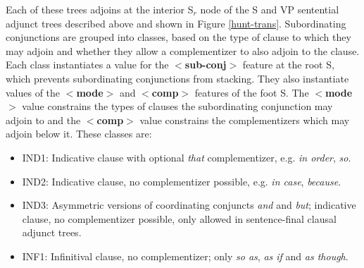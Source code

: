 Each of these trees adjoins at the interior S$_r$ node of the S and VP
sentential adjunct trees described above and shown in Figure \ref{hunt-trans}.
Subordinating conjunctions are grouped into classes, based on the type of
clause to which they may adjoin and whether they allow a complementizer to also
adjoin to the clause.  Each class instantiates a value for the {\bf
$<$sub-conj$>$} feature at the root S, which prevents subordinating
conjunctions from stacking.  They also instantiate values of the {\bf
$<$mode$>$} and {\bf $<$comp$>$} features of the foot S.  The {\bf $<$mode$>$}
value constrains the types of clauses the subordinating conjunction may adjoin
to and the {\bf $<$comp$>$} value constrains the complementizers which may
adjoin below it.  These classes are:

\begin{itemize}
\item IND1: Indicative clause with optional {\it that} complementizer,
e.g. {\it in order}, {\it so}.
\begin{itemize}
\end{itemize}

\item IND2: Indicative clause, no complementizer possible, e.g. {\it
in case}, {\it because}.
\begin{itemize}
\end{itemize}

\item IND3: Asymmetric versions of coordinating conjuncts {\it and}
and {\it but}; indicative clause, no complementizer possible, only
allowed in sentence-final clausal adjunct trees.
\begin{itemize}
\end{itemize}

\item INF1: Infinitival clause, no complementizer; only {\it so as}, {\it
as if} and {\it as though}.
\begin{itemize}
\end{itemize}


\end{itemize}
